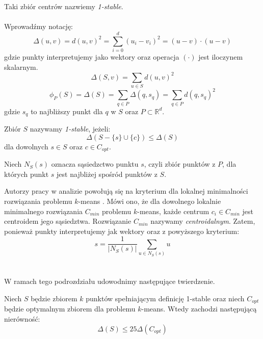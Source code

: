 Taki zbiór centrów nazwiemy \textit{1-stable}.
\\~\\
Wprowadźmy notację:
\begin{equation}
    \Delta(u, v) = d(u, v)^{2} = \sum_{i=0}^{d} (u_{i} - v_{i})^2 = (u - v)\cdot(u - v)
\end{equation}
gdzie punkty interpretujemy jako wektory oraz operacja $(\cdot)$ jest iloczynem skalarnym.
\begin{equation}
    \Delta(S, v) = \sum_{u \in S} d(u, v)^{2}
\end{equation}
\begin{equation}
    \phi_{P}(S) = \Delta(S) = \sum_{q \in P} \Delta(q,s_{q}) = \sum_{q \in P} d(q, s_{q})^{2}
\end{equation}
gdzie $s_{q}$ to najbliższy punkt dla $q$ w $S$ oraz $P \subset \mathbb{R}^{d}$. 

\begin{definition}
    Zbiór $S$ nazywamy \emph{1-stable}, jeżeli:
    \begin{equation}
        \Delta(S - \{s\} \cup \{c\}) \leq \Delta(S)
    \end{equation}
    dla dowolnych $s \in S$ oraz $c \in C_{opt}$.
\end{definition}

\begin{definition}
    Niech $N_{S}(s)$ oznacza sąsiedzctwo punktu $s$, czyli zbiór punktów z $P$, dla których punkt $s$ jest najbliżej spośród punktów z $S$.
\end{definition}

\noindent
Autorzy pracy \cite{Arya2004LocalSH} w analizie powołują się na kryterium dla lokalnej minimalności rozwiązania problemu $k$-means \cite{doi:10.1137/S0036144599352836}.
Mówi ono, że dla dowolnego lokalnie minimalnego rozwiązania $C_{min}$ problemu $k$-means, każde centrum $c_{i} \in C_{min}$ jest centroidem jego sąsiedztwa.
Rozwiązanie $C_{min}$ nazywamy \textit{centroidalnym}.
Zatem, ponieważ punkty interpretujemy jak wektory oraz z powyższego kryterium:
\begin{equation}
    s = \frac{1}{|N_{S}(s)|}\sum_{u \in N_{S}(s)} u
\end{equation}
\\~\\
W ramach tego podrozdziału udowodnimy następujące twierdzenie.

\begin{thm}{\cite{10.1145/1007352.1007400}}
    Niech $S$ będzie zbiorem $k$ punktów spełniającym definicję 1-stable oraz niech $C_{opt}$ będzie optymalnym zbiorem dla problemu $k$-means.
    Wtedy zachodzi następującą nierówność:
    \begin{equation}
        \Delta(S) \leq 25 \Delta(C_{opt})
    \end{equation} 
\end{thm}

